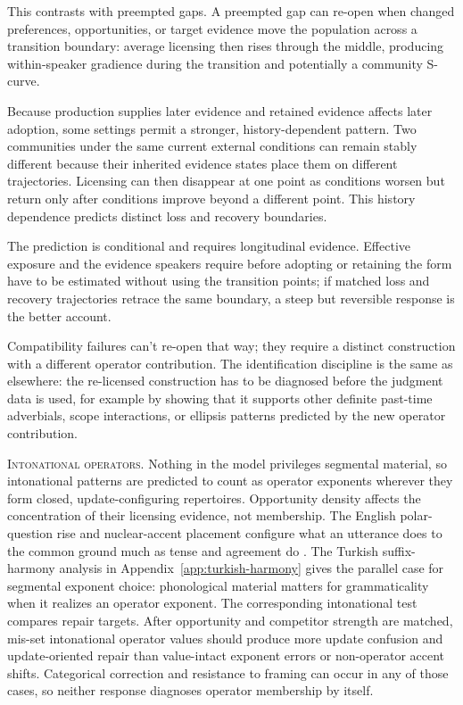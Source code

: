 \documentclass[12pt,letterpaper]{article}
\begin{document}
This contrasts with preempted gaps. A preempted gap can re-open when changed
preferences, opportunities, or target evidence move the population across a
transition boundary: average licensing then rises through the middle, producing
within-speaker gradience during the transition and potentially a community
S-curve.

Because production supplies later evidence and retained evidence affects later
adoption, some settings permit a stronger, history-dependent pattern. Two
communities under the same current external conditions can remain stably
different because their inherited evidence states place them on different
trajectories. Licensing can then disappear at one point as conditions worsen
but return only after conditions improve beyond a different point. This history
dependence predicts distinct loss and recovery boundaries.

The prediction is conditional and requires longitudinal evidence. Effective
exposure and the evidence speakers require before adopting or retaining the
form have to be estimated without using the transition points; if matched loss and
recovery trajectories retrace the same boundary, a steep but reversible
response is the better account.

Compatibility failures can't re-open that way; they require a distinct
construction with a different operator contribution. The identification discipline is the
same as elsewhere: the re-licensed construction has to be diagnosed before the
judgment data is used, for example by showing that it supports other definite
past-time adverbials, scope interactions, or ellipsis patterns predicted by the
new operator contribution.

\noindent\textsc{Intonational operators.} Nothing in the model privileges
segmental material, so intonational patterns are predicted to count as operator
exponents wherever they form closed, update-configuring repertoires. Opportunity
density affects the concentration of their licensing evidence, not membership.
The English polar-question rise and nuclear-accent placement
configure what an utterance does to the common ground much as tense and
agreement do \autocite{reynolds2026operators}. The Turkish suffix-harmony
analysis in Appendix~\ref{app:turkish-harmony} gives the parallel case for
segmental exponent choice: phonological material matters for grammaticality
when it realizes an operator exponent. The corresponding intonational test
compares repair targets. After opportunity and competitor strength are matched,
mis-set intonational operator values should produce more update confusion and
update-oriented repair than value-intact exponent errors or non-operator accent
shifts. Categorical correction and resistance to framing can occur in any of
those cases, so neither response diagnoses operator membership by itself.
\end{document}

